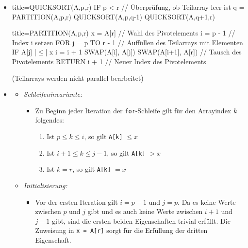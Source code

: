 \documentclass[
    12pt,
    a4paper,
    ngerman,
    color=3b,%
    marginpar=false,
    colorback=false,
    leqno,
]{tudaexercise}
\begin{document}
\begin{itemize}
    \item {}
          \begin{ccode}[autogobble,escapeinside=||]{title={QUICKSORT(A,p,r)}}
              IF p < r    // Überprüfung, ob Teilarray leer ist
                q = PARTITION(A,p,r)
                QUICKSORT(A,p,q-1)
                QUICKSORT(A,q+1,r)
          \end{ccode}
          \begin{ccode}[autogobble,escapeinside=||]{title={PARTITION(A,p,r)}}
              x = A[r]    // Wahl des Pivotelements
              i = p - 1   // Index i setzen
              FOR j = p TO r - 1 // Auffüllen des Teilarrays mit Elementen
                IF A[j] |$\leq$| x
                    i = i + 1
                    SWAP(A[i], A[j])
              SWAP(A[i+1], A[r]) // Tausch des Pivotelements
              RETURN i + 1 // Neuer Index des Pivotelements
          \end{ccode}
          (Teilarrays werden nicht parallel bearbeitet)
          \clearpage
    \item {}
          \begin{itemize}
              \item \textit{Schleifeninvariante:}
                    \begin{itemize}
                        \item[]
                              Zu Beginn jeder Iteration der \texttt{for}-Schleife gilt für den Arrayindex $k$ folgendes:
                              \begin{enumerate}
                                  \item Ist $p \leq k \leq i$, so gilt \texttt{A[k]} $\leq x$
                                  \item Ist $i+1 \leq k \leq j -1$, so gilt \texttt{A[k]} $> x$
                                  \item Ist $k = r$, so gilt \texttt{A[k]} $= x$
                              \end{enumerate}
                    \end{itemize}

              \item \textit{Initialisierung:}
                    \begin{itemize}
                        \item[]
                              Vor der ersten Iteration gilt $i = p - 1$ und $j = p$. Da es keine Werte zwischen $p$ und $j$
                              gibt und es auch keine Werte zwischen $i + 1$ und $j - 1$ gibt, sind die ersten beiden Eigenschaften
                              trivial erfüllt. Die Zuweisung in \texttt{x = A[r]} sorgt für die Erfüllung der dritten Eigenschaft.
                    \end{itemize}


\end{itemize}
\end{itemize}
\end{document}
